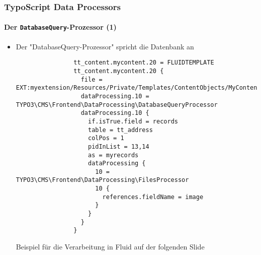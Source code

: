 
\begin{frame}[fragile]
	\frametitle{TypoScript Data Processors}
	\framesubtitle{Der \texttt{DatabaseQuery}-Prozessor (1)}

	\lstset{basicstyle=\tiny\ttfamily}

	\begin{itemize}

		\item Der "DatabaseQuery-Prozessor" spricht die Datenbank an

			\begin{lstlisting}
				tt_content.mycontent.20 = FLUIDTEMPLATE
				tt_content.mycontent.20 {
				  file = EXT:myextension/Resources/Private/Templates/ContentObjects/MyContent.html
				  dataProcessing.10 = TYPO3\CMS\Frontend\DataProcessing\DatabaseQueryProcessor
				  dataProcessing.10 {
				    if.isTrue.field = records
				    table = tt_address
				    colPos = 1
				    pidInList = 13,14
				    as = myrecords
				    dataProcessing {
				      10 = TYPO3\CMS\Frontend\DataProcessing\FilesProcessor
				      10 {
				        references.fieldName = image
				      }
				    }
				  }
				}
			\end{lstlisting}

			\vspace{0.2cm}
			\small
				Beispiel für die Verarbeitung in Fluid auf der folgenden Slide
			\normalsize

	\end{itemize}

\end{frame}


